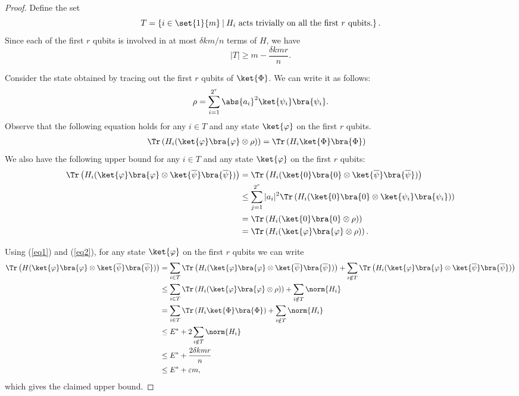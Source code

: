 \documentclass[11pt,a4paper]{article}
\theoremstyle{plain}
\theoremstyle{definition}
\begin{document}
\begin{proof}
Define the set 
\[
T=\left\{
i\in\set{1}{m}\:|\: H_i \textrm{ acts trivially on all the first $r$ qubits}.
\right\}.
\]
Since each of the first $r$ qubits is involved in at most $\delta k m/n$ terms of $H$, we have 
\[
|T|\ge m - \frac{\delta k mr}{n}.
\]


Consider the state obtained by tracing out the first $r$ qubits of $\ket{\Phi}$. We can write it as follows:
\[
\rho=\sum_{i=1}^{2^r} \abs{a_i}^2\ket{\psi_i}\bra{\psi_i}.
\]
Observe that the following equation holds for any $i\in T$ and any state $\ket{\varphi}$ on the first $r$ qubits.
\begin{align}
\label{eq1}
\Tr\left(H_i(\ket{\varphi}\bra{\varphi}\otimes \rho)\right)&=
\Tr\left(H_i\ket{\Phi}\bra{\Phi}\right)
\end{align}
We also have the following upper bound for any $i\in T$ and any state $\ket{\varphi}$ on the first $r$ qubits:
\begin{equation}
\label{eq2}
\begin{aligned}
\Tr\left(H_i(\ket{\varphi}\bra{\varphi}\otimes \ket{\overline{\psi}}\bra{\overline{\psi}})\right)
&=
\Tr\left(H_i(\ket{0}\bra{0}\otimes \ket{\overline{\psi}}\bra{\overline{\psi}})\right)\\
&\le
\sum_{j=1}^{2^r}|a_i|^2\Tr\left(H_i(\ket{0}\bra{0}\otimes \ket{\psi_i}\bra{\psi_i})\right)\\
&=
\Tr\left(H_i(\ket{0}\bra{0}\otimes \rho)\right)\\
&=
\Tr\left(H_i(\ket{\varphi}\bra{\varphi}\otimes \rho)\right).
\end{aligned}
\end{equation}


Using (\ref{eq1}) and (\ref{eq2}), for any state $\ket{\varphi}$ on the first $r$ qubits we can write
\begin{align*}
\Tr\left(H(\ket{\varphi}\bra{\varphi}\otimes \ket{\overline{\psi}}\bra{\overline{\psi}})\right)&=
\sum_{i\in T}\Tr\left(H_i(\ket{\varphi}\bra{\varphi}\otimes \ket{\overline{\psi}}\bra{\overline{\psi}})\right)+
\sum_{i\notin T}\Tr\left(H_i(\ket{\varphi}\bra{\varphi}\otimes \ket{\overline{\psi}}\bra{\overline{\psi}})\right)\\
&\le
\sum_{i\in T}\Tr\left(H_i(\ket{\varphi}\bra{\varphi}\otimes \rho)\right)+
\sum_{i\notin T}\norm{H_i}\\
&=
\sum_{i\in T}\Tr\left(H_i\ket{\Phi}\bra{\Phi}\right)
+
\sum_{i\notin T}\norm{H_i}\\
&\le
E^\ast
+
2\sum_{i\notin T}\norm{H_i}
\\
&\le
E^\ast + \frac{2\delta k mr}{n}\\
&\le
E^\ast+\varepsilon m,
\end{align*}
which gives the claimed upper bound.
\end{proof}
\end{document}
